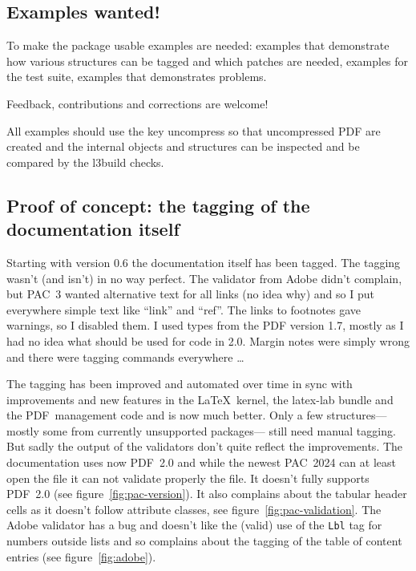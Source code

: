 \documentclass[bibliography=totoc,a4paper]{article}
\newcommand\PrintKeyName[1]{\textsf{#1}}
\newcommand\PDF{PDF}
\begin{document}
\subsection{Examples wanted!}

To make the package usable examples are needed: examples that demonstrate how 
various structures can be tagged and which patches are needed, examples for 
the test suite, examples that demonstrates problems. 


\begin{tcolorbox}
Feedback, contributions and corrections are welcome!
\end{tcolorbox}


All examples should use the  key \PrintKeyName{uncompress}
so that uncompressed \PDF{} are created and the internal objects and 
structures can be inspected and be compared by the l3build checks.%



\subsection{Proof of concept: the tagging of the documentation itself}

Starting with version 0.6 the documentation itself has been tagged. The 
tagging wasn't (and isn't) in no way perfect. The validator from Adobe didn't 
complain, but PAC~3 wanted alternative text for all links (no idea why) and 
so I put everywhere simple text like \enquote{link} and \enquote{ref}. The 
links to footnotes gave warnings, so I disabled them. I used types from the 
\PDF{} version 1.7, mostly as I had no idea what should be used for code in 
2.0. Margin notes were simply wrong and there were tagging commands 
everywhere \ldots 

The tagging has been improved and automated over time in sync with 
improvements and new features in the \LaTeX\ kernel, the latex-lab bundle and 
the \PDF\ management code and is now much better. Only a few 
structures---mostly some from currently unsupported packages--- still need 
manual tagging. But sadly the output of the validators don't quite reflect 
the improvements. The documentation uses now \PDF~2.0  and while the newest 
PAC~2024 can at least open the file it can not validate properly the file.
It doesn't fully supports \PDF~2.0 (see figure~\ref{fig:pac-version}). It also
complains about the tabular header cells as it doesn't follow attribute classes, see
figure~\ref{fig:pac-validation}.
The Adobe validator has a bug and 
doesn't like the (valid) use of  the \texttt{Lbl} tag for numbers outside lists and
so complains about the tagging of the table of content entries (see figure~\ref{fig:adobe}).  
\end{document}
